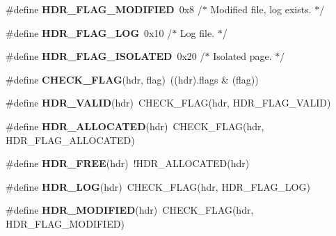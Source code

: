 \begin{DoxyCompactItemize}
\item 
\hypertarget{cfs-coffee_8c_ae92ff2dc70c3c4542c3f5bd1e11f6f88}{}\#define {\bfseries H\+D\+R\+\_\+\+F\+L\+A\+G\+\_\+\+M\+O\+D\+I\+F\+I\+E\+D}~0x8	/$\ast$ Modified file, log exists. $\ast$/\label{cfs-coffee_8c_ae92ff2dc70c3c4542c3f5bd1e11f6f88}

\item 
\hypertarget{cfs-coffee_8c_ab87e56f9bfa42530168810de9b29d787}{}\#define {\bfseries H\+D\+R\+\_\+\+F\+L\+A\+G\+\_\+\+L\+O\+G}~0x10	/$\ast$ Log file. $\ast$/\label{cfs-coffee_8c_ab87e56f9bfa42530168810de9b29d787}

\item 
\hypertarget{cfs-coffee_8c_a1ebe5362ba2682888f8817ccb8575660}{}\#define {\bfseries H\+D\+R\+\_\+\+F\+L\+A\+G\+\_\+\+I\+S\+O\+L\+A\+T\+E\+D}~0x20	/$\ast$ Isolated page. $\ast$/\label{cfs-coffee_8c_a1ebe5362ba2682888f8817ccb8575660}

\item 
\hypertarget{cfs-coffee_8c_ad27405398c5f34e84ce881378a205123}{}\#define {\bfseries C\+H\+E\+C\+K\+\_\+\+F\+L\+A\+G}(hdr,  flag)~((hdr).flags \& (flag))\label{cfs-coffee_8c_ad27405398c5f34e84ce881378a205123}

\item 
\hypertarget{cfs-coffee_8c_a38c59f2a6d0c9a71030291a8c51a1628}{}\#define {\bfseries H\+D\+R\+\_\+\+V\+A\+L\+I\+D}(hdr)~C\+H\+E\+C\+K\+\_\+\+F\+L\+A\+G(hdr, H\+D\+R\+\_\+\+F\+L\+A\+G\+\_\+\+V\+A\+L\+I\+D)\label{cfs-coffee_8c_a38c59f2a6d0c9a71030291a8c51a1628}

\item 
\hypertarget{cfs-coffee_8c_a26e47fae4678f80f5bff65335ab9ce09}{}\#define {\bfseries H\+D\+R\+\_\+\+A\+L\+L\+O\+C\+A\+T\+E\+D}(hdr)~C\+H\+E\+C\+K\+\_\+\+F\+L\+A\+G(hdr, H\+D\+R\+\_\+\+F\+L\+A\+G\+\_\+\+A\+L\+L\+O\+C\+A\+T\+E\+D)\label{cfs-coffee_8c_a26e47fae4678f80f5bff65335ab9ce09}

\item 
\hypertarget{cfs-coffee_8c_a3f1297abb1939622f594e93ae4e47ad2}{}\#define {\bfseries H\+D\+R\+\_\+\+F\+R\+E\+E}(hdr)~!H\+D\+R\+\_\+\+A\+L\+L\+O\+C\+A\+T\+E\+D(hdr)\label{cfs-coffee_8c_a3f1297abb1939622f594e93ae4e47ad2}

\item 
\hypertarget{cfs-coffee_8c_a517fc5af67d929cfdf2911abf0d8d097}{}\#define {\bfseries H\+D\+R\+\_\+\+L\+O\+G}(hdr)~C\+H\+E\+C\+K\+\_\+\+F\+L\+A\+G(hdr, H\+D\+R\+\_\+\+F\+L\+A\+G\+\_\+\+L\+O\+G)\label{cfs-coffee_8c_a517fc5af67d929cfdf2911abf0d8d097}

\item 
\hypertarget{cfs-coffee_8c_a2bdeb8732c61cb693a29c496d20579af}{}\#define {\bfseries H\+D\+R\+\_\+\+M\+O\+D\+I\+F\+I\+E\+D}(hdr)~C\+H\+E\+C\+K\+\_\+\+F\+L\+A\+G(hdr, H\+D\+R\+\_\+\+F\+L\+A\+G\+\_\+\+M\+O\+D\+I\+F\+I\+E\+D)\label{cfs-coffee_8c_a2bdeb8732c61cb693a29c496d20579af}


\end{DoxyCompactItemize}
